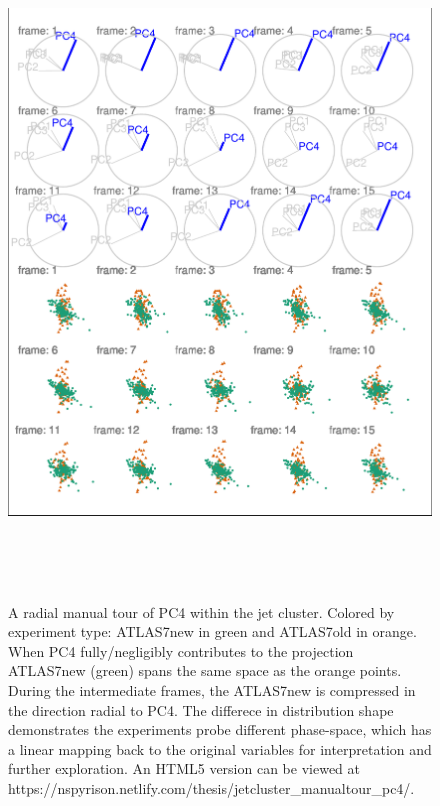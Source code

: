 \begin{Schunk}
\begin{figure}

{\centering \includegraphics[width=5.83in,height=7in]{spinifex_paper_files/figure-latex/JetClusterGood-1} 

}

\caption[A radial manual tour of PC4 within the jet cluster]{A radial manual tour of PC4 within the jet cluster. Colored by experiment type: ATLAS7new in green and ATLAS7old in orange. When PC4 fully/negligibly contributes to the projection ATLAS7new (green) spans the same space as the orange points. During the intermediate frames, the ATLAS7new is compressed in the direction radial to PC4. The differece in distribution shape demonstrates the experiments probe different phase-space, which has a linear mapping back to the original variables for interpretation and further exploration. An HTML5 version can be viewed at https://nspyrison.netlify.com/thesis/jetcluster\_manualtour\_pc4/.}\label{fig:JetClusterGood}
\end{figure}
\end{Schunk}

